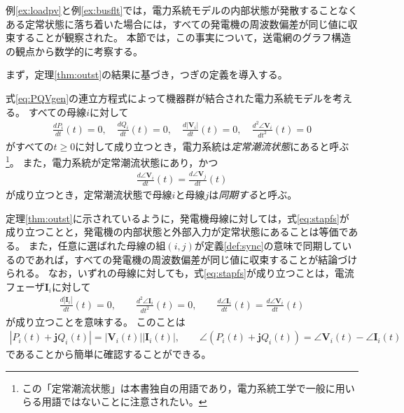 \documentclass[tombow,dvipdfmx]{corona-a5-1.1}
\begin{document}
例\ref{ex:loadpv}と例\ref{ex:busflt}では，電力系統モデルの内部状態が発散することなくある定常状態に落ち着いた場合には，すべての発電機の周波数偏差が同じ値に収束することが観察された。
本節では，この事実について，送電網のグラフ構造の観点から数学的に考察する。

まず，定理\ref{thm:outst}の結果に基づき，つぎの定義を導入する。

\begin{定義}[定常潮流状態と母線電圧の同期]
\label{def:sync}
式\ref{eq:PQVgen}の連立方程式によって機器群が結合された電力系統モデルを考える。
すべての母線$i$に対して
\begin{align}\label{eq:stapfs}
\frac{dP_i}{dt}(t)=0
,\quad
\frac{dQ_i}{dt}(t)=0
,\quad
\frac{d|\bm{V}_i|}{dt}(t)=0
,\quad
\frac{d^2 \angle \bm{V}_i }{dt^2}(t)=0
\end{align}
がすべての$t\geq0$に対して成り立つとき，電力系統は\emph{定常潮流状態}にあると呼ぶ
\footnote{
この「定常潮流状態」は本書独自の用語であり，電力系統工学で一般に用いらる用語ではないことに注意されたい。
}。
また，電力系統が定常潮流状態にあり，かつ
\begin{align}\label{eq:defsyn}
\frac{d \angle \bm{V}_i}{dt}(t) =  \frac{d \angle \bm{V}_j}{dt}(t)
\end{align}
が成り立つとき，定常潮流状態で母線$i$と母線$j$は\emph{同期する}と呼ぶ。
\end{定義}

定理\ref{thm:outst}に示されているように，発電機母線に対しては，式\ref{eq:stapfs}が成り立つことと，発電機の内部状態と外部入力が定常状態にあることは等価である。
また，任意に選ばれた母線の組$(i,j)$が定義\ref{def:sync}の意味で同期しているのであれば，すべての発電機の周波数偏差が同じ値に収束することが結論づけられる。
なお，いずれの母線に対しても，式\ref{eq:stapfs}が成り立つことは，電流フェーザ$\bm{I}_i$に対して
\begin{align*}
\frac{d|\bm{I}_i|}{dt}(t)=0
,\qquad
\frac{d^2 \angle \bm{I}_i }{dt^2}(t)=0
,\qquad
\frac{d \angle \bm{I}_i }{dt}(t) = \frac{d \angle \bm{V}_i }{dt} (t)
\end{align*}
が成り立つことを意味する。
このことは
\begin{align*}
|P_i(t) + \bm{j} Q_i(t)| = |\bm{V}_i(t)| |\bm{I}_i(t)|
,\qquad
\angle(P_i(t) + \bm{j} Q_i(t)) = \angle \bm{V}_i(t) - \angle \bm{I}_i(t)
\end{align*}
であることから簡単に確認することができる。
\end{document}
